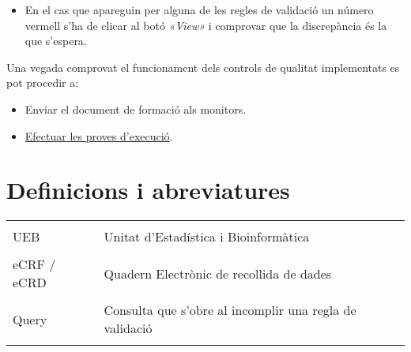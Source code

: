 \documentclass[
]{article}
\providecommand{\tightlist}{%
  \setlength{\itemsep}{0pt}\setlength{\parskip}{0pt}}
\begin{document}
\begin{itemize}
\tightlist
\item
  En el cas que apareguin per alguna de les regles de validació un número vermell s'ha de clicar al botó \emph{«View»} i comprovar que la discrepància és la que s'espera.
\end{itemize}

Una vegada comprovat el funcionament dels controls de qualitat implementats es pot procedir a:

\begin{itemize}
\tightlist
\item
  Enviar el document de formació als monitors.
\item
  \protect\hyperlink{en2}{Efectuar les proves d'execució}.
\end{itemize}

\hypertarget{definicions-i-abreviatures}{%
\section{\texorpdfstring{\textbf{Definicions i abreviatures}}{Definicions i abreviatures}}\label{definicions-i-abreviatures}}

\begin{table}[!h]
\centering\begingroup\fontsize{13}{15}\selectfont

\begin{tabular}{l|l}
\hline
\cellcolor[HTML]{993489}{\textcolor{white}{Abreviatura / Nom}} & \cellcolor[HTML]{993489}{\textcolor{white}{Definició}}\\
\hline
\cellcolor{gray!6}{REDCAP} & \cellcolor{gray!6}{Research Electronic Data Capture}\\
\hline
UEB & Unitat d’Estadística i Bioinformàtica\\
\hline
\cellcolor{gray!6}{CRD / CRF} & \cellcolor{gray!6}{Quadern de recollida de dades (“Case Report Form”)}\\
\hline
eCRF / eCRD & Quadern Electrònic de recollida de dades\\
\hline
\cellcolor{gray!6}{Esdeveniments} & \cellcolor{gray!6}{Aquelles entrades que representen mesures d’una mateixa informació en diferents punts del tempse o bé canvis derivats del proces}\\
\hline
Query & Consulta que s’obre al incomplir una regla de validació\\
\hline
\cellcolor{gray!6}{PQ} & \cellcolor{gray!6}{Qualificació del funcionament}\\
\hline
\end{tabular}
\endgroup{}
\end{table}
\end{document}
